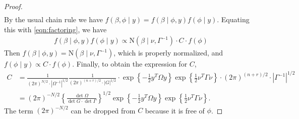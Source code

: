 \documentclass[10pt]{article}
\begin{document}
\begin{proof}
\begin{align}
\end{align}
%
By the usual chain rule we have $f(\beta, \phi \mid y) = f(\beta \mid \phi, y) f(\phi \mid y)$. Equating this with \eqref{eqn:factoring}, we have
%
\begin{align*}
f(\beta \mid \phi, y) f(\phi \mid y) \propto \text{N}(\beta \mid \nu, \Gamma^{-1}) \cdot C \cdot f(\phi)
\end{align*}
%
Then $f(\beta \mid \phi, y) = \text{N}(\beta \mid \nu, \Gamma^{-1})$, which is properly normalized, and $f(\phi \mid y) \propto C \cdot f(\phi)$. Finally, to obtain the expression for $C$,
%
\begin{align*}
C &= \frac{1}{ (2\pi)^{N/2} \cdot |\Omega^{-1}|^{1/2}}
\frac{1}{ (2\pi)^{(n+r)/2} \cdot |G|^{1/2}} \cdot \exp\left\{ -\frac{1}{2} y^T \Omega y \right\} \exp\left\{ \frac{1}{2} \nu^T \Gamma \nu \right\} \cdot (2\pi)^{(n+r)/2} \cdot |\Gamma^{-1}|^{1/2} \\
&= (2\pi)^{-N/2} \left\{ \frac{ \det \Omega }{\det G \cdot \det \Gamma} \right\}^{1/2}
\exp\left\{ -\frac{1}{2} y^T \Omega y \right\} \exp\left\{ \frac{1}{2} \nu^T \Gamma \nu \right\}.
\end{align*}
%
The term $(2\pi)^{-N/2}$ can be dropped from $C$ because it is free of $\phi$.

\end{proof}




%
\end{document}
